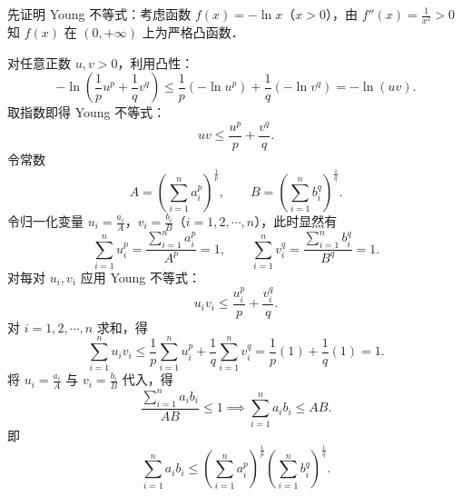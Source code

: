 \begin{myproof}
    先证明 Young 不等式：考虑函数 $f(x) = -\ln x$（$x > 0$），由 $f''(x) = \frac{1}{x^2} > 0$ 知 $f(x)$ 在 $(0, +\infty)$ 上为严格凸函数．

    对任意正数 $u, v > 0$，利用凸性：
    \begin{equation}
        -\ln\left( \frac{1}{p}u^p + \frac{1}{q}v^q \right) \leqslant \frac{1}{p}(-\ln u^p) + \frac{1}{q}(-\ln v^q) = -\ln(uv).
    \end{equation}
    取指数即得 Young 不等式：
    \begin{equation}
        uv \leqslant \frac{u^p}{p} + \frac{v^q}{q}.
    \end{equation}
    令常数
    \begin{equation}
        A = \left( \sum_{i=1}^n a_i^p \right)^{\frac{1}{p}}, \qquad B = \left( \sum_{i=1}^n b_i^q \right)^{\frac{1}{q}}.
    \end{equation}
    令归一化变量 $u_i = \frac{a_i}{A}$，$v_i = \frac{b_i}{B}$（$i = 1, 2, \cdots, n$），此时显然有
    \begin{equation}
        \sum_{i=1}^n u_i^p = \frac{\sum_{i=1}^n a_i^p}{A^p} = 1, \qquad \sum_{i=1}^n v_i^q = \frac{\sum_{i=1}^n b_i^q}{B^q} = 1.
    \end{equation}
    对每对 $u_i, v_i$ 应用 Young 不等式：
    \begin{equation}
        u_i v_i \leqslant \frac{u_i^p}{p} + \frac{v_i^q}{q}.
    \end{equation}
    对 $i = 1, 2, \cdots, n$ 求和，得
    \begin{equation}
        \sum_{i=1}^n u_i v_i \leqslant \frac{1}{p}\sum_{i=1}^n u_i^p + \frac{1}{q}\sum_{i=1}^n v_i^q = \frac{1}{p}(1) + \frac{1}{q}(1) = 1.
    \end{equation}
    将 $u_i = \frac{a_i}{A}$ 与 $v_i = \frac{b_i}{B}$ 代入，得
    \begin{equation}
        \frac{\sum_{i=1}^n a_i b_i}{AB} \leqslant 1 \implies \sum_{i=1}^n a_i b_i \leqslant AB.
    \end{equation}
    即
    \begin{equation}
        \sum_{i=1}^n a_i b_i \leqslant \left( \sum_{i=1}^n a_i^p \right)^{\frac{1}{p}} \left( \sum_{i=1}^n b_i^q \right)^{\frac{1}{q}}.
    \end{equation}
\end{myproof}

\endinput
